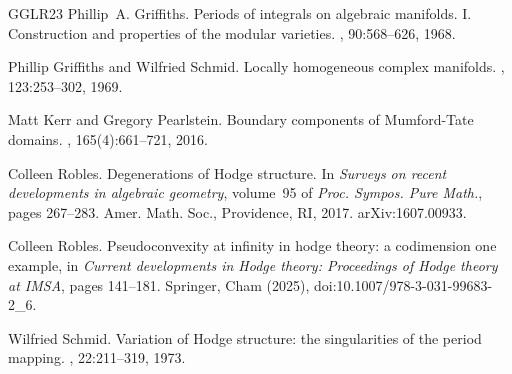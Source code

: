 \documentclass[12pt]{amsart}
\numberwithin{equation}{section}
\numberwithin{table}{section}
\theoremstyle{definition}
\theoremstyle{definition}
\theoremstyle{remark}
\begin{document}
\begin{thebibliography}{GGLR23}
Phillip~A. Griffiths.
\newblock Periods of integrals on algebraic manifolds. {I}. {C}onstruction and
  properties of the modular varieties.
, 90:568--626, 1968.

Phillip Griffiths and Wilfried Schmid.
\newblock Locally homogeneous complex manifolds.
, 123:253--302, 1969.

Matt Kerr and Gregory Pearlstein.
\newblock Boundary components of {M}umford-{T}ate domains.
, 165(4):661--721, 2016.

Colleen Robles.
\newblock Degenerations of {H}odge structure.
\newblock In {\em Surveys on recent developments in algebraic geometry},
  volume~95 of {\em Proc. Sympos. Pure Math.}, pages 267--283. Amer. Math.
  Soc., Providence, RI, 2017.
\newblock arXiv:1607.00933.

Colleen Robles.
\newblock Pseudoconvexity at infinity in hodge theory: a codimension one example, in \emph{Current developments in Hodge theory: Proceedings of Hodge theory at IMSA}, pages 141--181.
\newblock Springer, Cham (2025), doi:10.1007/978-3-031-99683-2\_6.

Wilfried Schmid.
\newblock Variation of {H}odge structure: the singularities of the period
  mapping.
, 22:211--319, 1973.

\end{thebibliography}


\end{document}
